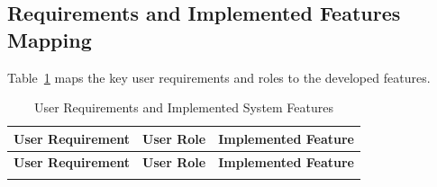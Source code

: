 \documentclass[11pt,a4paper]{article}
\begin{document}
\subsection{Requirements and Implemented Features Mapping}
Table~\ref{tab:requirements} maps the key user requirements and roles to the developed features.

\begin{longtable}{p{4.5cm} p{3.2cm} p{7.5cm}}
\caption{User Requirements and Implemented System Features} \label{tab:requirements} \\
\toprule
\textbf{User Requirement} & \textbf{User Role} & \textbf{Implemented Feature} \\
\midrule
\endfirsthead
\toprule
\textbf{User Requirement} & \textbf{User Role} & \textbf{Implemented Feature} \\
\midrule
\endhead
\bottomrule
\endfoot


\end{longtable}
\end{document}
